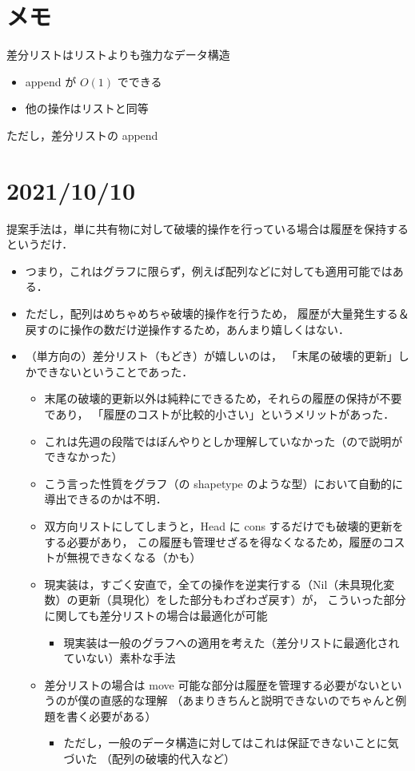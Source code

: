 \documentclass[10pt, a4j, twocolumn]{scrartcl}
\begin{document}
\section{メモ}
\label{sec:org3a98c9e}

差分リストはリストよりも強力なデータ構造
\begin{itemize}
\item append が \(O(1)\) でできる
\item 他の操作はリストと同等
\end{itemize}


ただし，差分リストの append


\section{2021/10/10}
\label{sec:org7efbc89}

提案手法は，単に共有物に対して破壊的操作を行っている場合は履歴を保持するというだけ．
\begin{itemize}
\item つまり，これはグラフに限らず，例えば配列などに対しても適用可能ではある．
\item ただし，配列はめちゃめちゃ破壊的操作を行うため，
履歴が大量発生する＆戻すのに操作の数だけ逆操作するため，あんまり嬉しくはない．
\item （単方向の）差分リスト（もどき）が嬉しいのは，
「末尾の破壊的更新」しかできないということであった．
\begin{itemize}
\item 末尾の破壊的更新以外は純粋にできるため，それらの履歴の保持が不要であり，
「履歴のコストが比較的小さい」というメリットがあった．
\item これは先週の段階ではぼんやりとしか理解していなかった（ので説明ができなかった）
\item こう言った性質をグラフ（の shapetype のような型）において自動的に導出できるのかは不明．
\item 双方向リストにしてしまうと，Head に cons するだけでも破壊的更新をする必要があり，
この履歴も管理せざるを得なくなるため，履歴のコストが無視できなくなる（かも）
\item 現実装は，すごく安直で，全ての操作を逆実行する（Nil（未具現化変数）の更新（具現化）をした部分もわざわざ戻す）が，
こういった部分に関しても差分リストの場合は最適化が可能
\begin{itemize}
\item 現実装は一般のグラフへの適用を考えた（差分リストに最適化されていない）素朴な手法
\end{itemize}
\item 差分リストの場合は move 可能な部分は履歴を管理する必要がないというのが僕の直感的な理解
（あまりきちんと説明できないのでちゃんと例題を書く必要がある）
\begin{itemize}
\item ただし，一般のデータ構造に対してはこれは保証できないことに気づいた
（配列の破壊的代入など）
\end{itemize}
\end{itemize}
\end{itemize}
\end{document}
